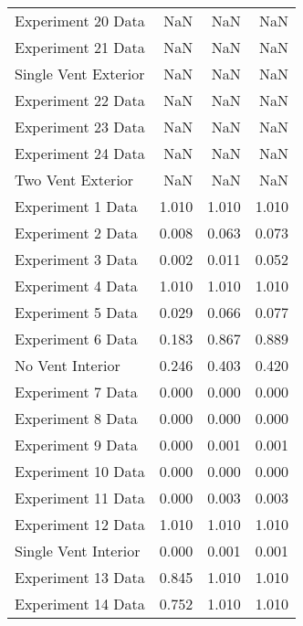 \begin{tabular}{lrrr}
Experiment 20 Data   &              NaN &              NaN &        NaN \\
Experiment 21 Data   &              NaN &              NaN &        NaN \\
Single Vent Exterior &              NaN &              NaN &        NaN \\
Experiment 22 Data   &              NaN &              NaN &        NaN \\
Experiment 23 Data   &              NaN &              NaN &        NaN \\
Experiment 24 Data   &              NaN &              NaN &        NaN \\
Two Vent Exterior    &              NaN &              NaN &        NaN \\
Experiment 1 Data    &            1.010 &            1.010 &      1.010 \\
Experiment 2 Data    &            0.008 &            0.063 &      0.073 \\
Experiment 3 Data    &            0.002 &            0.011 &      0.052 \\
Experiment 4 Data    &            1.010 &            1.010 &      1.010 \\
Experiment 5 Data    &            0.029 &            0.066 &      0.077 \\
Experiment 6 Data    &            0.183 &            0.867 &      0.889 \\
No Vent Interior     &            0.246 &            0.403 &      0.420 \\
Experiment 7 Data    &            0.000 &            0.000 &      0.000 \\
Experiment 8 Data    &            0.000 &            0.000 &      0.000 \\
Experiment 9 Data    &            0.000 &            0.001 &      0.001 \\
Experiment 10 Data   &            0.000 &            0.000 &      0.000 \\
Experiment 11 Data   &            0.000 &            0.003 &      0.003 \\
Experiment 12 Data   &            1.010 &            1.010 &      1.010 \\
Single Vent Interior &            0.000 &            0.001 &      0.001 \\
Experiment 13 Data   &            0.845 &            1.010 &      1.010 \\
Experiment 14 Data   &            0.752 &            1.010 &      1.010 \\

\end{tabular}

